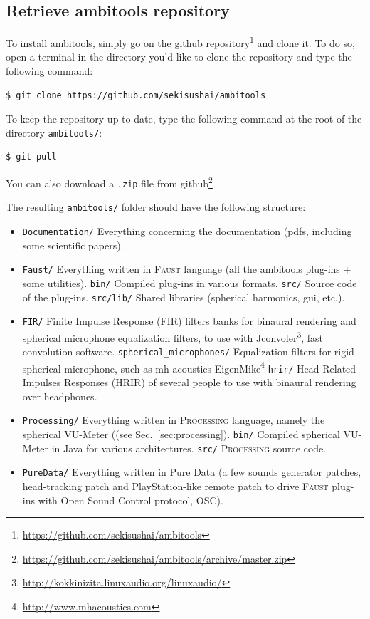 \documentclass[10pt,a4paper]{article}
\begin{document}
\subsection{Retrieve ambitools repository}
To install ambitools, simply go on the github repository\footnote{\url{https://github.com/sekisushai/ambitools}} and clone it. To do so, open a terminal in the directory you'd like to clone the repository and type the following command:

\begin{lstlisting}
$ git clone https://github.com/sekisushai/ambitools
\end{lstlisting}

To keep the repository up to date, type the following command at the root of the directory \lstinline`ambitools/`:

\begin{lstlisting}
$ git pull
\end{lstlisting}

You can also download a \lstinline'.zip' file from github\footnote{\url{https://github.com/sekisushai/ambitools/archive/master.zip}}

The resulting \lstinline'ambitools/' folder should have the following structure:

\begin{itemize}
    \item \lstinline'Documentation/' Everything concerning the documentation (pdfs, including some scientific papers).
    \item \lstinline'Faust/' Everything written in \textsc{Faust} language (all the ambitools plug-ins + some utilities).
    	\subitem \lstinline'bin/' Compiled plug-ins in various formats.
    	\subitem \lstinline'src/' Source code of the plug-ins.
    	\subitem \lstinline'src/lib/' Shared libraries (spherical harmonics, gui, etc.).
    \item \lstinline'FIR/' Finite Impulse Response (FIR) filters banks for binaural rendering and spherical microphone equalization filters, to use with Jconvoler\footnote{\url{http://kokkinizita.linuxaudio.org/linuxaudio/}}, fast convolution software.
    	\subitem \lstinline'spherical_microphones/' Equalization filters for rigid spherical microphone, such as mh acoustics EigenMike\textsuperscript{\textregistered}\footnote{\url{http://www.mhacoustics.com}}
  		\subitem \lstinline'hrir/' Head Related Impulses Responses (HRIR) of several people to use with binaural rendering over headphones.
    \item \lstinline'Processing/' Everything written in \textsc{Processing} language, namely the spherical VU-Meter ((see Sec.~\ref{sec:processing}).
    	 \subitem \lstinline'bin/' Compiled spherical VU-Meter in Java for various architectures.
    	 \subitem \lstinline'src/' \textsc{Processing} source code.
    \item \lstinline'PureData/' Everything written in Pure Data (a few sounds generator patches, head-tracking patch and PlayStation-like remote patch to drive \textsc{Faust} plug-ins with Open Sound Control protocol, OSC).
\end{itemize}
\end{document}
